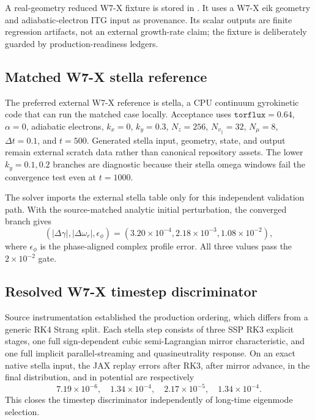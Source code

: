 \documentclass[11pt,a4paper]{article}
\begin{document}
A real-geometry reduced W7-X fixture is stored in
.  It uses a W7-X eik geometry and
adiabatic-electron ITG input as provenance.  Its scalar
outputs are finite regression artifacts, not an external growth-rate claim; the
fixture is deliberately guarded by production-readiness ledgers.

\subsection{Matched W7-X stella reference}

The preferred external W7-X reference is stella, a CPU continuum gyrokinetic
code that can run the matched case locally.  Acceptance uses
\(\texttt{torflux}=0.64\), \(\alpha=0\), adiabatic electrons, \(k_x=0\),
\(k_y=0.3\), \(N_z=256\), \(N_{v_\parallel}=32\), \(N_\mu=8\),
\(\Delta t=0.1\), and \(t=500\).  Generated stella input, geometry, state, and
output remain external scratch data rather than canonical repository assets.
The lower \(k_y=0.1,0.2\) branches are diagnostic because their stella omega
windows fail the convergence test even at \(t=1000\).

The solver imports the external stella  table only for this
independent validation path.  With the source-matched analytic initial
perturbation, the converged branch gives
\[
(|\Delta\gamma|,|\Delta\omega_r|,\epsilon_\phi)
=(3.20\times10^{-4},2.18\times10^{-3},1.08\times10^{-2}),
\]
where \(\epsilon_\phi\) is the phase-aligned complex profile error.  All three
values pass the \(2\times10^{-2}\) gate.

\subsection{Resolved W7-X timestep discriminator}

Source instrumentation established the production ordering, which differs from
a generic RK4 Strang split.  Each stella step consists of three SSP RK3 explicit
stages, one full sign-dependent cubic semi-Lagrangian mirror characteristic,
and one full implicit parallel-streaming and quasineutrality response.  On an
exact native stella input, the JAX replay errors after RK3, after mirror advance,
in the final distribution, and in potential are respectively
\[
7.19\times10^{-6},\quad 1.34\times10^{-4},\quad
2.17\times10^{-5},\quad 1.34\times10^{-4}.
\]
This closes the timestep discriminator independently of long-time eigenmode
selection.
\end{document}
